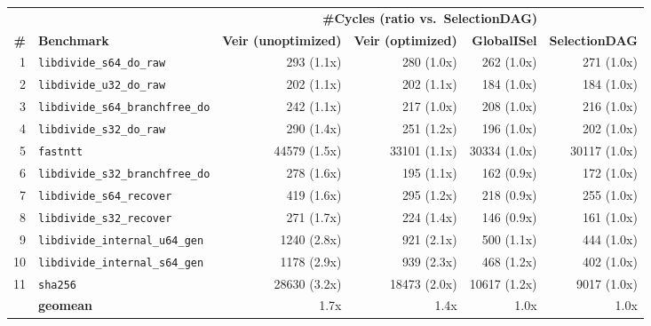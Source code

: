     \centering
    \footnotesize
    \begin{tabular}{r l r r r r }
        \toprule
        & & \multicolumn{4}{c}{\textbf{\#Cycles (ratio vs.\ SelectionDAG)}} \\
        \cmidrule(lr){3-6}
        \textbf{\#} & \textbf{Benchmark} & \textbf{Veir (unoptimized)} & \textbf{Veir (optimized)} & \textbf{GlobalISel} & \textbf{SelectionDAG} \\
        \midrule
        1 & \texttt{libdivide\_s64\_do\_raw} & 293 (1.1x) & 280 (1.0x) & 262 (1.0x) & 271 (1.0x) \\
        2 & \texttt{libdivide\_u32\_do\_raw} & 202 (1.1x) & 202 (1.1x) & 184 (1.0x) & 184 (1.0x) \\
        3 & \texttt{libdivide\_s64\_branchfree\_do} & 242 (1.1x) & 217 (1.0x) & 208 (1.0x) & 216 (1.0x) \\
        4 & \texttt{libdivide\_s32\_do\_raw} & 290 (1.4x) & 251 (1.2x) & 196 (1.0x) & 202 (1.0x) \\
        5 & \texttt{fastntt} & 44579 (1.5x) & 33101 (1.1x) & 30334 (1.0x) & 30117 (1.0x) \\
        6 & \texttt{libdivide\_s32\_branchfree\_do} & 278 (1.6x) & 195 (1.1x) & 162 (0.9x) & 172 (1.0x) \\
        7 & \texttt{libdivide\_s64\_recover} & 419 (1.6x) & 295 (1.2x) & 218 (0.9x) & 255 (1.0x) \\
        8 & \texttt{libdivide\_s32\_recover} & 271 (1.7x) & 224 (1.4x) & 146 (0.9x) & 161 (1.0x) \\
        9 & \texttt{libdivide\_internal\_u64\_gen} & 1240 (2.8x) & 921 (2.1x) & 500 (1.1x) & 444 (1.0x) \\
        10 & \texttt{libdivide\_internal\_s64\_gen} & 1178 (2.9x) & 939 (2.3x) & 468 (1.2x) & 402 (1.0x) \\
        11 & \texttt{sha256} & 28630 (3.2x) & 18473 (2.0x) & 10617 (1.2x) & 9017 (1.0x) \\
        \midrule
        & \textbf{geomean} & 1.7x & 1.4x & 1.0x & 1.0x \\
        \bottomrule
    \end{tabular}
    \label{cycles_ratio_table_real}